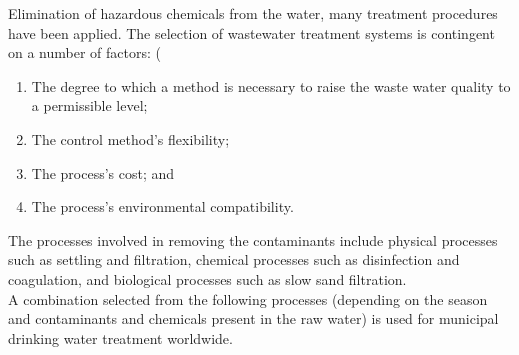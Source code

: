 Elimination of hazardous chemicals from the water, many treatment procedures have been applied. The selection of wastewater treatment systems is contingent on a number of factors: (
\begin{enumerate}
\item The degree to which a method is necessary to raise the waste water quality to a permissible level; 
\item The control method's flexibility;
\item The process's cost; and
\item The process's environmental compatibility.\\
\end{enumerate}
The processes involved in removing the contaminants include physical processes such as settling and filtration, chemical processes such as disinfection and coagulation, and biological processes such as slow sand filtration.\\
A combination selected from the following processes (depending on the season and contaminants and chemicals present in the raw water) is used for municipal drinking water treatment worldwide.\\

